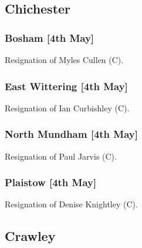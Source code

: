 \documentclass[a4paper,openany]{book}
\begin{document}
\begin{resultsiii}
\subsection*{Chichester}

\subsubsection*{Bosham \hspace*{\fill}\nolinebreak[1]%
\enspace\hspace*{\fill}
[4th May]}


Resignation of Myles Cullen (C).

\subsubsection*{East Wittering \hspace*{\fill}\nolinebreak[1]%
\enspace\hspace*{\fill}
[4th May]}


Resignation of Ian Curbishley (C).

\subsubsection*{North Mundham \hspace*{\fill}\nolinebreak[1]%
\enspace\hspace*{\fill}
[4th May]}


Resignation of Paul Jarvis (C).

\subsubsection*{Plaistow \hspace*{\fill}\nolinebreak[1]%
\enspace\hspace*{\fill}
[4th May]}


Resignation of Denise Knightley (C).

\subsection*{Crawley}


\end{resultsiii}
\end{document}
